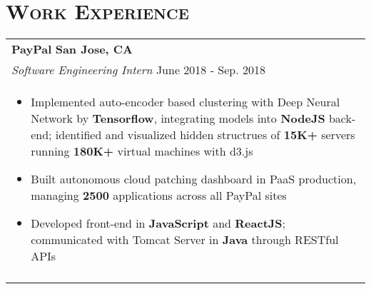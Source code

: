 \documentclass[letterpaper,11pt]{article} %
\begin{document}
{\section{\Large\bf\textsc{Work Experience}}
\begin{tabular}{p{18.5cm}}

{\bf{PayPal}} \hfill \bf{San Jose, CA}\\
{\it Software Engineering Intern} \hfill June 2018 - Sep. 2018\\%
\begin{itemize}
\vspace{-3mm}

\item Implemented auto-encoder based clustering with Deep Neural Network by {\bf Tensorflow}, integrating models into {\bf NodeJS} back-end; identified and visualized hidden structrues of {\bf 15K+} servers running {\bf 180K+} virtual machines with d3.js 
\item Built autonomous cloud patching dashboard in PaaS production, managing {\bf 2500} applications across all PayPal sites 
\item Developed front-end in {\bf JavaScript} and {\bf ReactJS}; communicated with Tomcat Server in {\bf Java} through RESTful APIs
\vspace*{-\baselineskip} 
\end{itemize} \\ 
\vspace{.1mm}


\end{tabular}}
\end{document}
